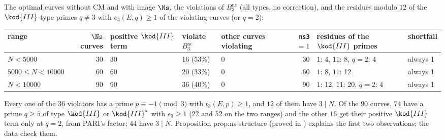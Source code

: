\begin{sloppypar}
\begin{example}\label{ex:computation:repro-ns}
The optimal curves without CM and with image $\Ns$, the violations of $B^{\mathrm{nc}}_3$ (all types, no correction), and the residues modulo $12$ of the
$\kod{III}$-type primes $q\ne3$ with $e_3(E,q)\ge1$ of the violating curves (or $q=2$):
\begin{center}\footnotesize\setlength{\tabcolsep}{4pt}
\begin{tabular}{lrp{1.2cm}p{1.4cm}p{1.2cm}rp{2.4cm}p{1cm}}
\toprule
range & $\Ns$ curves & positive $\kod{III}$ term & violate $B^{\mathrm{nc}}_3$ & other curves violating & \texttt{ns3} $=1$ & residues of the $\kod{III}$ primes & short\-fall\\
\midrule
$N<5000$ & 30 & 30 & 16 (53\%) & 0 & 30 & $1$: 4, $11$: 8, $q=2$: 4 & always 1\\
$5000\le N<10000$ & 60 & 60 & 20 (33\%) & 0 & 60 & $1$: 8, $11$: 12 & always 1\\
$N<10000$ & 90 & 90 & 36 (40\%) & 0 & 90 & $1$: 12, $11$: 20, $q=2$: 4 & always 1\\
\bottomrule
\end{tabular}
\end{center}
Every one of the $36$ violators has a prime $p\equiv-1\pmod3$ with $t_3(E,p)\ge1$, and $12$ of them have $3\mid N$. Of the $90$ curves, $74$ have a prime $q\ge5$ of type
$\kod{III}$ or $\kod{III}^*$ with $e_3\ge1$ ($22$ and $52$ on the two ranges) and the other $16$ get their positive $\kod{III}$ term only at $q=2$, from PARI's factor; $44$
have $3\mid N$. Proposition prop:ns-structure (proved in ) explains the first two observations; the data check them.


\end{example}
\end{sloppypar}
